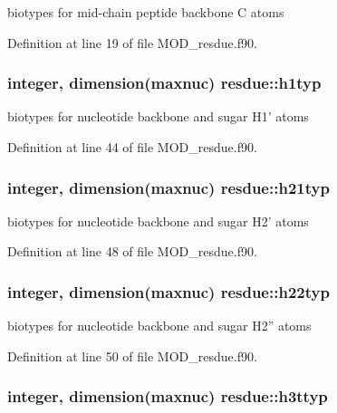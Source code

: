 biotypes for mid-\/chain peptide backbone C atoms 



Definition at line 19 of file M\-O\-D\-\_\-resdue.\-f90.

\hypertarget{classresdue_abfce73e98bff9796dcd0952e096b336a}{
\subsubsection[{h1typ}]{\setlength{\rightskip}{0pt plus 5cm}integer, dimension(maxnuc) resdue\-::h1typ}}\label{classresdue_abfce73e98bff9796dcd0952e096b336a}


biotypes for nucleotide backbone and sugar H1' atoms 



Definition at line 44 of file M\-O\-D\-\_\-resdue.\-f90.

\hypertarget{classresdue_a8b5a106a65951bc071a5bfc7c20a070a}{
\subsubsection[{h21typ}]{\setlength{\rightskip}{0pt plus 5cm}integer, dimension(maxnuc) resdue\-::h21typ}}\label{classresdue_a8b5a106a65951bc071a5bfc7c20a070a}


biotypes for nucleotide backbone and sugar H2' atoms 



Definition at line 48 of file M\-O\-D\-\_\-resdue.\-f90.

\hypertarget{classresdue_a75f6e2e38296c7b1427e911d97fbcba4}{
\subsubsection[{h22typ}]{\setlength{\rightskip}{0pt plus 5cm}integer, dimension(maxnuc) resdue\-::h22typ}}\label{classresdue_a75f6e2e38296c7b1427e911d97fbcba4}


biotypes for nucleotide backbone and sugar H2'' atoms 



Definition at line 50 of file M\-O\-D\-\_\-resdue.\-f90.

\hypertarget{classresdue_a6002cb84b9ca25f2776d1020ca1fbb5c}{
\subsubsection[{h3ttyp}]{\setlength{\rightskip}{0pt plus 5cm}integer, dimension(maxnuc) resdue\-::h3ttyp}}\label{classresdue_a6002cb84b9ca25f2776d1020ca1fbb5c}


